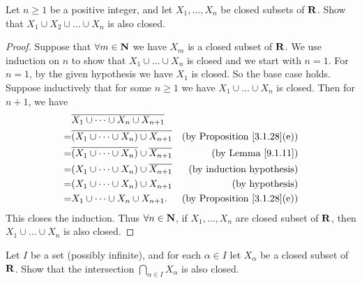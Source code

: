 \begin{exercise}\label{ex 9.1.7}
    Let \(n \geq 1\) be a positive integer, and let \(X_1, \dots, X_n\) be closed subsets of \(\mathbf{R}\).
    Show that \(X_1 \cup X_2 \cup \dots \cup X_n\) is also closed.
\end{exercise}

\begin{proof}
    Suppose that \(\forall m \in \mathbf{N}\) we have \(X_m\) is a closed subset of \(\mathbf{R}\).
    We use induction on \(n\) to show that \(X_1 \cup \dots \cup X_n\) is closed and we start with \(n = 1\).
    For \(n = 1\), by the given hypothesis we have \(X_1\) is closed.
    So the base case holds.
    Suppose inductively that for some \(n \geq 1\) we have \(X_1 \cup \dots \cup X_n\) is closed.
    Then for \(n + 1\), we have
    \begin{align*}
          & \overline{X_1 \cup \dots \cup X_n \cup X_{n + 1}}                                                        \\
        = & \overline{(X_1 \cup \dots \cup X_n) \cup X_{n + 1}}            & \text{(by Proposition \ref{3.1.28}(e))} \\
        = & \overline{(X_1 \cup \dots \cup X_n)} \cup \overline{X_{n + 1}} & \text{(by Lemma \ref{9.1.11})}          \\
        = & (X_1 \cup \dots \cup X_n) \cup \overline{X_{n + 1}}            & \text{(by induction hypothesis)}        \\
        = & (X_1 \cup \dots \cup X_n) \cup X_{n + 1}                       & \text{(by hypothesis)}                  \\
        = & X_1 \cup \dots \cup X_n \cup X_{n + 1}.                        & \text{(by Proposition \ref{3.1.28}(e))}
    \end{align*}
    This closes the induction.
    Thus \(\forall n \in \mathbf{N}\), if \(X_1, \dots, X_n\) are closed subset of \(\mathbf{R}\), then \(X_1 \cup \dots \cup X_n\) is also closed.
\end{proof}

\begin{exercise}\label{ex 9.1.8}
    Let \(I\) be a set (possibly infinite), and for each \(\alpha \in I\) let \(X_{\alpha}\) be a closed subset of \(\mathbf{R}\).
    Show that the intersection \(\bigcap_{\alpha \in I} X_{\alpha}\) is also closed.
\end{exercise}


